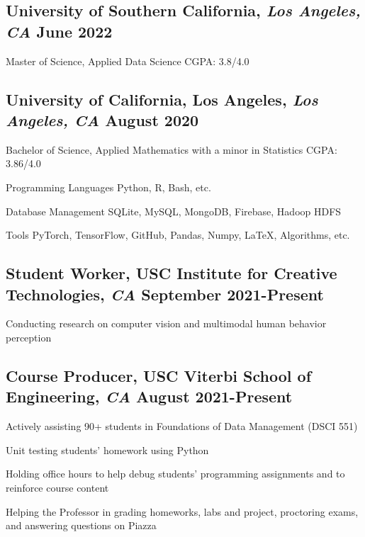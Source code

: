 \documentclass[11pt]{article}
\begin{document}
\subsection*{University of Southern California{\normalfont, \textit{Los Angeles, CA} \hfill June 2022}}
\noindent
Master of Science, Applied Data Science
\hfill
CGPA: 3.8/4.0

\vspace{0.1in}

\subsection*{University of California, Los Angeles{\normalfont, \textit{Los Angeles, CA} \hfill August 2020}}
\noindent
Bachelor of Science, Applied Mathematics with a minor in Statistics 
\hfill 
CGPA: 3.86/4.0

\vspace{0.1in}

\begin{compactdesc}
    \item[Programming Languages] Python, R, Bash, etc.
    \item[Database Management] SQLite, MySQL, MongoDB, Firebase, Hadoop HDFS
    \item[Tools] PyTorch, TensorFlow, GitHub, Pandas, Numpy, \LaTeX, 
    Algorithms, etc.
\end{compactdesc}
\vspace{0.1in}

\subsection*{Student Worker{\normalfont, USC Institute for Creative 
Technologies, 
		\textit{CA} \hfill 
		September 2021-Present}}
\begin{compactitem}
	\item Conducting research on computer vision and multimodal 
	human behavior perception
\end{compactitem}
\vspace{0.1in}

\subsection*{Course Producer{\normalfont, USC Viterbi School of Engineering, 
\textit{CA} \hfill 
August 2021-Present}}
\begin{compactitem}
	\item Actively assisting 90+ students in Foundations of Data Management 
	(DSCI 551)
	\item Unit testing students' homework using Python
	\item Holding office hours to help debug students’ programming assignments 
	and to reinforce 
	course content 
	\item Helping the Professor in grading homeworks, labs and project, 
	proctoring exams, and 
	answering questions on Piazza
\end{compactitem}
\vspace{0.1in}
\end{document}
